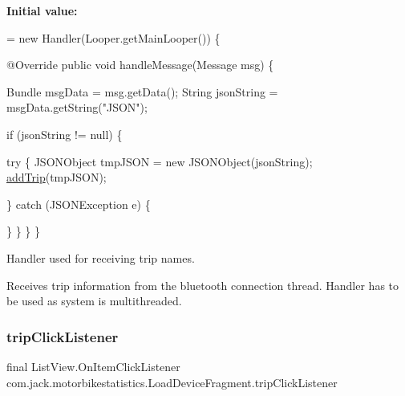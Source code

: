 {\bfseries Initial value\+:}
\begin{DoxyCode}
= \textcolor{keyword}{new} Handler(Looper.getMainLooper()) \{

        
        @Override
        \textcolor{keyword}{public} \textcolor{keywordtype}{void} handleMessage(Message msg) \{

            Bundle msgData = msg.getData();
            String jsonString = msgData.getString(\textcolor{stringliteral}{"JSON"});

            \textcolor{keywordflow}{if} (jsonString != null) \{

                
                \textcolor{keywordflow}{try} \{
                    JSONObject tmpJSON = \textcolor{keyword}{new} JSONObject(jsonString);
                    \hyperlink{classcom_1_1jack_1_1motorbikestatistics_1_1_load_device_fragment_a23957dbe1518052c7167d86938a14c35}{addTrip}(tmpJSON);

                \} \textcolor{keywordflow}{catch} (JSONException e) \{
                    
                \}
            \}
        \}
    \}
\end{DoxyCode}


Handler used for receiving trip names. 

Receives trip information from the bluetooth connection thread. Handler has to be used as system is multithreaded. \mbox{\label{classcom_1_1jack_1_1motorbikestatistics_1_1_load_device_fragment_a06ac1ecf82b1709e25421b1b77eb768c}} 
\subsubsection{\texorpdfstring{trip\+Click\+Listener}{tripClickListener}}
{\footnotesize\ttfamily final List\+View.\+On\+Item\+Click\+Listener com.\+jack.\+motorbikestatistics.\+Load\+Device\+Fragment.\+trip\+Click\+Listener}

